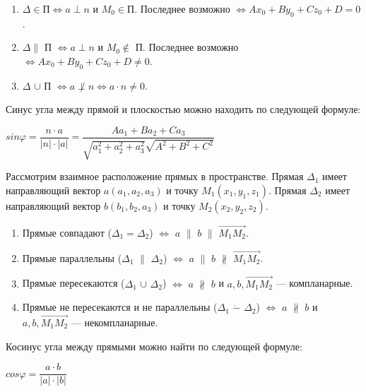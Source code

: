 \documentclass[a4paper, 12pt]{report}
\begin{document}
	\begin{enumerate}
		\item $\Delta \in \text{П} \Leftrightarrow a \perp n \text{ и } M_0 \in \text{П}$. Последнее возможно $\Leftrightarrow Ax_0 + By_0 + Cz_0 + D = 0$.
		
		\item $\Delta \parallel$ П $\Leftrightarrow a \perp n$ и $M_0 \notin$ П. Последнее возможно $\Leftrightarrow Ax_0 + By_0 + Cz_0 + D \ne 0$.
		
		\item $\Delta$ $\cup$ П $\Leftrightarrow a \not \perp n \Leftrightarrow a \cdot n \ne 0$.
	\end{enumerate}
	Синус угла между прямой и плоскостью можно находить по следующей формуле:
	\begin{center}
		$sin\varphi = \dfrac{n \cdot a}{|n| \cdot |a|} = \dfrac{Aa_1 + Ba_2 + Ca_3}{\sqrt{a_1^2 + a_2^2 + a_3^2}\sqrt{A^2 + B^2 + C^2}}$
	\end{center}
	Рассмотрим взаимное расположение прямых в пространстве. Прямая $\Delta_1$ имеет направляющий вектор $a(a_1, a_2, a_3)$ и точку $M_1(x_1, y_1, z_1)$. Прямая $\Delta_2$ имеет направляющий вектор $b(b_1, b_2, a_3)$ и точку $M_2(x_2, y_2, z_2)$. 
	\begin{enumerate}
		\item Прямые совпадают ($\Delta_1 = \Delta_2$) $\Leftrightarrow$ $a$ $\parallel$ $b$ $\parallel$ $\overrightarrow{M_1M_2}$.
		
		\item Прямые параллельны ($\Delta_1$ $\parallel$ $\Delta_2$) $\Leftrightarrow$ $a$ $\parallel$ $b$ $\nparallel$ $\overrightarrow{M_1M_2}$.
		
		\item Прямые пересекаются ($\Delta_1$ $\cup$ $\Delta_2$) $\Leftrightarrow$ $a$ $\nparallel$ $b$ и $a, b, \overrightarrow{M_1M_2}$ --- компланарные.
		
		\item Прямые не пересекаются и не параллельны ($\Delta_1$ $\dot{-}$ $\Delta_2$) $\Leftrightarrow$ $a$ $\nparallel$ $b$ и $a, b, \overrightarrow{M_1M_2}$ --- некомпланарные.
	\end{enumerate}
	Косинус угла между прямыми можно найти по следующей формуле:
	\begin{center}
		$cos\varphi = \dfrac{a \cdot b}{|a| \cdot |b|}$
	\end{center}
	
	
	
	
\end{document}
